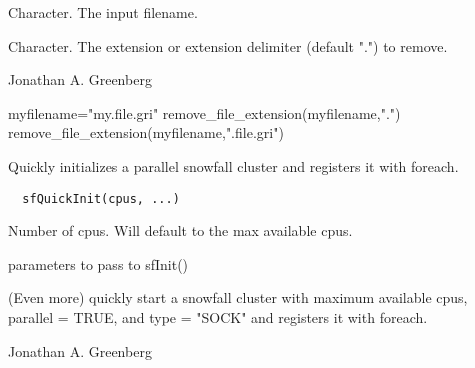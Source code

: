 \documentclass[a4paper]{book}
\begin{document}
%
\begin{Arguments}
\begin{ldescription}
\item[\code{filename}] Character. The input filename.

\item[\code{extension\_delimiter}] Character. The extension or
extension delimiter (default ".") to remove.
\end{ldescription}
\end{Arguments}
%
\begin{Author}\relax
Jonathan A. Greenberg 
\end{Author}
%
\begin{Examples}
\begin{ExampleCode}
myfilename="my.file.gri"
remove_file_extension(myfilename,".")
remove_file_extension(myfilename,".file.gri")
\end{ExampleCode}
\end{Examples}
%
\begin{Description}\relax
Quickly initializes a parallel snowfall cluster and
registers it with foreach.
\end{Description}
%
\begin{Usage}
\begin{verbatim}
  sfQuickInit(cpus, ...)
\end{verbatim}
\end{Usage}
%
\begin{Arguments}
\begin{ldescription}
\item[\code{cpus}] Number of cpus.  Will default to the max
available cpus.

\item[\code{...}] parameters to pass to sfInit()
\end{ldescription}
\end{Arguments}
%
\begin{Details}\relax
(Even more) quickly start a snowfall cluster with maximum
available cpus, parallel = TRUE, and type = "SOCK" and
registers it with foreach.
\end{Details}
%
\begin{Author}\relax
Jonathan A. Greenberg
\end{Author}
%
\begin{SeeAlso}\relax
{}
\end{SeeAlso}
\end{document}
